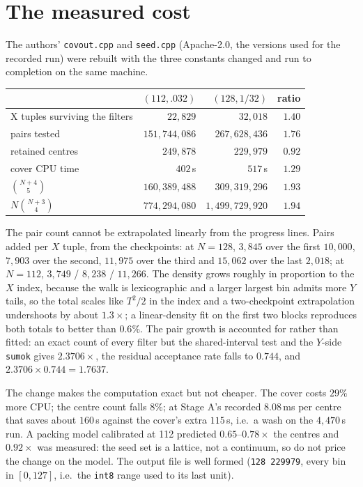 \documentclass[11pt]{article}
\begin{document}
\section{The measured cost}

The authors' \texttt{covout.cpp} and \texttt{seed.cpp} (Apache-2.0, the versions used for the
recorded run) were rebuilt with the three constants changed and run to completion on the same
machine.

\begin{center}
\begin{tabular}{lrrr}
\toprule
 & $(112,.032)$ & $(128,1/32)$ & ratio\\
\midrule
X tuples surviving the filters & $22{,}829$ & $32{,}018$ & $1.40$\\
pairs tested & $151{,}744{,}086$ & $267{,}628{,}436$ & $1.76$\\
retained centres & $249{,}878$ & $229{,}979$ & $0.92$\\
cover CPU time & $402$\,s & $517$\,s & $1.29$\\
$\binom{N+4}{5}$ & $160{,}389{,}488$ & $309{,}319{,}296$ & $1.93$\\
$N\binom{N+3}{4}$ & $774{,}294{,}080$ & $1{,}499{,}729{,}920$ & $1.94$\\
\bottomrule
\end{tabular}
\end{center}

\noindent
The pair count cannot be extrapolated linearly from the progress lines. Pairs added per $X$ tuple,
from the checkpoints: at $N=128$, $3{,}845$ over the first $10{,}000$, $7{,}903$ over the second,
$11{,}975$ over the third and $15{,}062$ over the last $2{,}018$; at $N=112$, $3{,}749$ / $8{,}238$ /
$11{,}266$. The density grows roughly in proportion to the $X$ index, because the walk is
lexicographic and a larger largest bin admits more $Y$ tails, so the total scales like $T^2/2$ in the
index and a two-checkpoint extrapolation undershoots by about $1.3\times$; a linear-density fit on
the first two blocks reproduces both totals to better than $0.6\%$. The pair growth is accounted for
rather than fitted: an exact count of every filter but the shared-interval test and the $Y$-side
\texttt{sumok} gives $2.3706\times$, the residual acceptance rate falls to $0.744$, and
$2.3706\times0.744=1.7637$.

The change makes the computation exact but not cheaper. The cover costs $29\%$ more CPU; the centre
count falls $8\%$; at Stage A's recorded $8.08$\,ms per centre that saves about $160$\,s against the
cover's extra $115$\,s, i.e.\ a wash on the $4{,}470$\,s run. A packing model calibrated at 112
predicted $0.65$--$0.78\times$ the centres and $0.92\times$ was measured: the seed set is a lattice,
not a continuum, so do not price the change on the model. The output file is well formed
(\texttt{128 229979}, every bin in $[0,127]$, i.e.\ the \texttt{int8} range used to its last unit).
\end{document}
